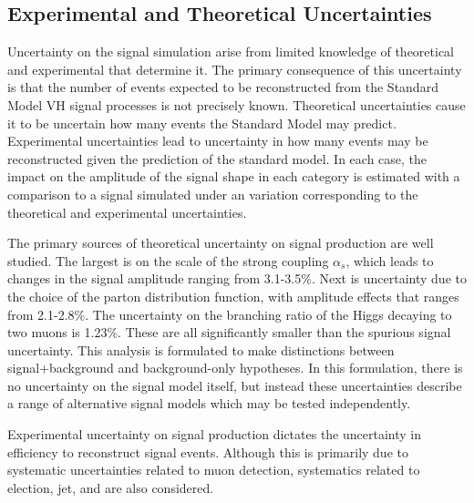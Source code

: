 \subsection{Experimental and Theoretical Uncertainties}

Uncertainty on the signal simulation arise from limited knowledge of theoretical and experimental that determine it. 
The primary consequence of this uncertainty is that the number of events expected to be reconstructed from the Standard Model VH signal processes is not precisely known.
Theoretical uncertainties cause it to be uncertain how many events the Standard Model may predict.
Experimental uncertainties lead to uncertainty in how many events may be reconstructed given the prediction of the standard model.
In each case, the impact on the amplitude of the signal shape in each category is estimated with a comparison to a signal simulated under an variation corresponding to the theoretical and experimental uncertainties.

The primary sources of theoretical uncertainty on signal production are well studied. \cite{CERNYellowReport4}
The largest is on the scale of the strong coupling $\alpha_s$, which leads to changes in the signal amplitude ranging from 3.1-3.5\%.
Next is uncertainty due to the choice of the parton distribution function, with amplitude effects that ranges from 2.1-2.8\%.
The uncertainty on the branching ratio of the Higgs decaying to two muons is 1.23\%. \cite{CERNYellowReport4}
These are all significantly smaller than the spurious signal uncertainty.
This analysis is formulated to make distinctions between signal+background and background-only hypotheses.
In this formulation, there is no uncertainty on the signal model itself, but instead these uncertainties describe a range of alternative signal models which may be tested independently.

Experimental uncertainty on signal production dictates the uncertainty in efficiency to reconstruct signal events. 
Although this is primarily due to systematic uncertainties related to muon detection, systematics related to election, jet, and \met are also considered.

